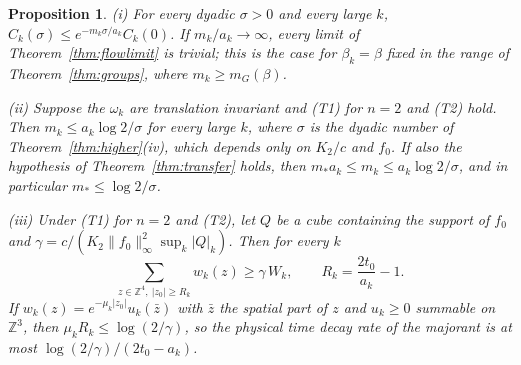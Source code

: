 \documentclass[aps,prd,twocolumn,superscriptaddress,nofootinbib,longbibliography,floatfix,amsmath,amssymb,10pt]{revtex4-2}
\newtheorem{proposition}[theorem]{Proposition}
\theoremstyle{definition}
\theoremstyle{remark}
\newcommand{\Z}{\mathbb{Z}}
\begin{document}
\begin{proposition}\label{prop:treecritical}
\textup{(i)} For every dyadic $\sigma>0$ and every large $k$,
$C_k(\sigma)\le e^{-m_k\sigma/a_k}C_k(0)$. If $m_k/a_k\to\infty$, every
limit of Theorem~\textup{\ref{thm:flowlimit}} is trivial; this is the case
for $\beta_k=\beta$ fixed in the range of Theorem~\textup{\ref{thm:groups}},
where $m_k\ge m_G(\beta)$.

\textup{(ii)} Suppose the $\omega_k$ are translation invariant and
\textup{(T1)} for $n=2$ and \textup{(T2)} hold. Then $m_k\le a_k\log2/\sigma$
for every large $k$, where $\sigma$ is the dyadic number of
Theorem~\textup{\ref{thm:higher}(iv)}, which depends only on $K_2/c$ and
$f_0$. If also the hypothesis of Theorem~\textup{\ref{thm:transfer}} holds,
then $m_*a_k\le m_k\le a_k\log2/\sigma$, and in particular
$m_*\le\log2/\sigma$.

\textup{(iii)} Under \textup{(T1)} for $n=2$ and \textup{(T2)}, let $Q$ be a
cube containing the support of $f_0$ and
$\gamma=c/(K_2\|f_0\|_\infty^2\sup_k|Q|_k)$. Then for every $k$
\[
\sum_{z\in\Z^4,\ |z_0|\ge R_k}w_k(z)\ge\gamma\,W_k,\qquad
R_k=\frac{2t_0}{a_k}-1 .
\]
If $w_k(z)=e^{-\mu_k|z_0|}u_k(\bar z)$ with $\bar z$ the spatial part of $z$
and $u_k\ge0$ summable on $\Z^3$, then $\mu_kR_k\le\log(2/\gamma)$, so the
physical time decay rate of the majorant is at most
$\log(2/\gamma)/(2t_0-a_k)$.
\end{proposition}
\end{document}
